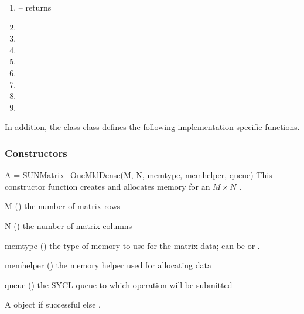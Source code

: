 \begin{enumerate}
  \item {} -- returns 
  \item {}
  \item {}
  \item {}
  \item {}
  \item {}
  \item {}
  \item {}
  \item {}
\end{enumerate}


In addition, the  class class defines the following
implementation specific functions.

\subsubsection*{Constructors}

{
  A = SUNMatrix\_OneMklDense(M, N, memtype, memhelper, queue)
}
{
  This constructor function creates and allocates memory for an $M \times N$
   .
}
{
  \begin{args}[memhelper]
  \item[M] () the number of matrix rows
  \item[N] () the number of matrix columns
  \item[memtype] () the type of memory to use for the matrix data; can be  or .
  \item[memhelper] () the memory helper used for allocating data
  \item[queue] () the SYCL queue to which operation will be submitted
  \end{args}
}
{
  A  object if successful else .
}
{}

